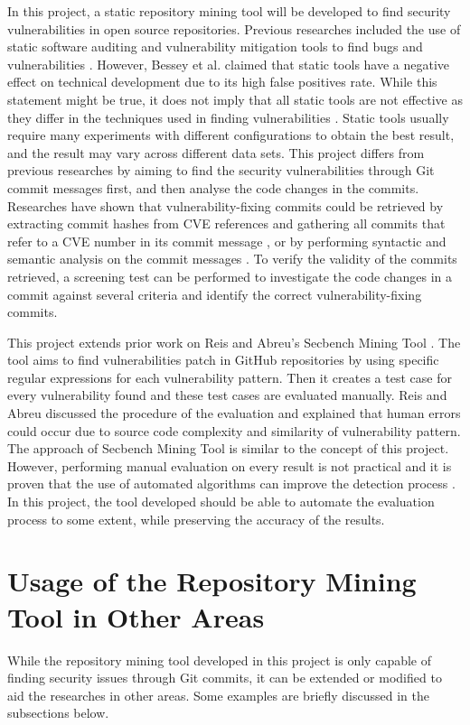 \documentclass[12pt, a4paper]{report}
\begin{document}
In this project, a static repository mining tool will be developed to find security vulnerabilities
in open source repositories. Previous researches included the use of static software auditing and
vulnerability mitigation tools to find bugs and vulnerabilities \cite{cowan_2003}. However, Bessey
et al. \cite{bessey_2010} claimed that static tools have a negative effect on technical development
due to its high false positives rate. While this statement might be true, it does not imply that all
static tools are not effective as they differ in the techniques used in finding vulnerabilities
\cite{moser_2008}. Static tools usually require many experiments with different configurations to
obtain the best result, and the result may vary across different data sets. This project differs
from previous researches by aiming to find the security vulnerabilities through Git commit messages
first, and then analyse the code changes in the commits. Researches have shown that
vulnerability-fixing commits could be retrieved by extracting commit hashes from CVE references and
gathering all commits that refer to a CVE number in its commit message \cite{jimenez_2016}, or by
performing syntactic and semantic analysis on the commit messages \cite{sliwerski_2005}. To verify
the validity of the commits retrieved, a screening test \cite{dashevskyi_2018} can be performed to
investigate the code changes in a commit against several criteria and identify the correct
vulnerability-fixing commits.

This project extends prior work on Reis and Abreu's Secbench Mining Tool \cite{secbench}. The tool
aims to find vulnerabilities patch in GitHub repositories by using specific regular expressions for
each vulnerability pattern. Then it creates a test case for every vulnerability found and these test
cases are evaluated manually. Reis and Abreu \cite{reis_2017} discussed the procedure of the
evaluation and explained that human errors could occur due to source code complexity and similarity
of vulnerability pattern. The approach of Secbench Mining Tool is similar to the concept of this
project. However, performing manual evaluation on every result is not practical and it is proven
that the use of automated algorithms can improve the detection process \cite{livshits_2005}. In this
project, the tool developed should be able to automate the evaluation process to some extent, while
preserving the accuracy of the results.

\section{Usage of the Repository Mining Tool in Other Areas}
While the repository mining tool developed in this project is only capable of finding security
issues through Git commits, it can be extended or modified to aid the researches in other areas.
Some examples are briefly discussed in the subsections below.
\end{document}
